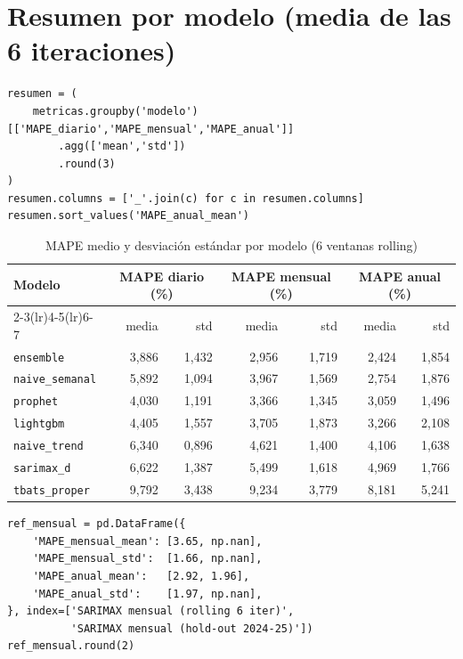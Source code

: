 \documentclass[12pt,a4paper]{article}
\begin{document}
\section{Resumen por modelo (media de las 6 iteraciones)}
\label{sec:resumen}

\begin{lstlisting}[caption={Resumen agregado por modelo}]
resumen = (
    metricas.groupby('modelo')[['MAPE_diario','MAPE_mensual','MAPE_anual']]
        .agg(['mean','std'])
        .round(3)
)
resumen.columns = ['_'.join(c) for c in resumen.columns]
resumen.sort_values('MAPE_anual_mean')
\end{lstlisting}

\begin{table}[H]
\centering
\caption{MAPE medio y desviación estándar por modelo (6 ventanas rolling)}
\begin{tabular}{lrrrrrr}
\toprule
Modelo
  & \multicolumn{2}{c}{MAPE diario (\%)}
  & \multicolumn{2}{c}{MAPE mensual (\%)}
  & \multicolumn{2}{c}{MAPE anual (\%)} \\
\cmidrule(lr){2-3}\cmidrule(lr){4-5}\cmidrule(lr){6-7}
  & media & std & media & std & media & std \\
\midrule
\texttt{ensemble}       & 3{,}886 & 1{,}432 & 2{,}956 & 1{,}719 & 2{,}424 & 1{,}854 \\
\texttt{naive\_semanal} & 5{,}892 & 1{,}094 & 3{,}967 & 1{,}569 & 2{,}754 & 1{,}876 \\
\texttt{prophet}        & 4{,}030 & 1{,}191 & 3{,}366 & 1{,}345 & 3{,}059 & 1{,}496 \\
\texttt{lightgbm}       & 4{,}405 & 1{,}557 & 3{,}705 & 1{,}873 & 3{,}266 & 2{,}108 \\
\texttt{naive\_trend}   & 6{,}340 & 0{,}896 & 4{,}621 & 1{,}400 & 4{,}106 & 1{,}638 \\
\texttt{sarimax\_d}     & 6{,}622 & 1{,}387 & 5{,}499 & 1{,}618 & 4{,}969 & 1{,}766 \\
\texttt{tbats\_proper}  & 9{,}792 & 3{,}438 & 9{,}234 & 3{,}779 & 8{,}181 & 5{,}241 \\
\bottomrule
\end{tabular}
\end{table}

\begin{lstlisting}[caption={Referencia: SARIMAX mensual baseline}]
ref_mensual = pd.DataFrame({
    'MAPE_mensual_mean': [3.65, np.nan],
    'MAPE_mensual_std':  [1.66, np.nan],
    'MAPE_anual_mean':   [2.92, 1.96],
    'MAPE_anual_std':    [1.97, np.nan],
}, index=['SARIMAX mensual (rolling 6 iter)',
          'SARIMAX mensual (hold-out 2024-25)'])
ref_mensual.round(2)
\end{lstlisting}
\end{document}
